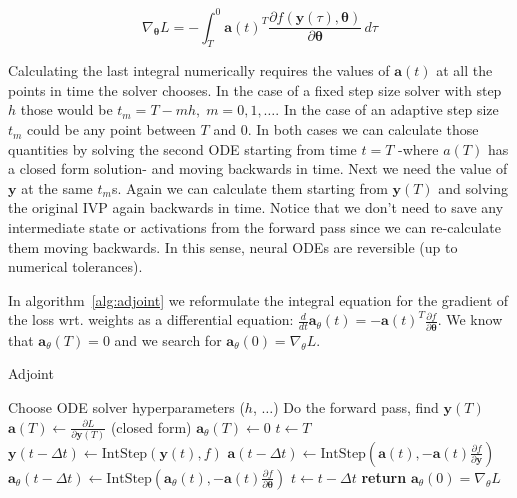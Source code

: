 \documentclass{article}
\begin{document}
    \begin{equation*}
        \nabla_{\pmb{\theta}} L =
        - \int_T^0
        \pmb{a}(t)^T
        \frac
        {\partial f(\pmb{y}(\tau), \pmb{\theta})}
        {\partial \pmb{\theta}}
        \, d\tau
    \end{equation*}

    Calculating the last integral numerically requires the values of $\pmb{a}(t)$ at all the points in time the solver chooses.
    In the case of a fixed step size solver with step $h$ those would be $t_m = T - mh, \; m=0,1,\dots$.
    In the case of an adaptive step size $t_m$ could be any point between $T$ and $0$.
    In both cases we can calculate those quantities by solving the second ODE starting from time $t=T$ -where $a(T)$ has a closed form solution- and moving backwards in time.
    Next we need the value of $\pmb{y}$ at the same $t_m$s. Again we can calculate them starting from $\pmb{y}(T)$ and solving the original IVP again backwards in time.
    Notice that we don't need to save any intermediate state or activations from the forward pass since we can re-calculate them moving backwards.
    In this sense, neural ODEs are reversible (up to numerical tolerances).

    In algorithm~\ref{alg:adjoint} we reformulate the integral equation for the gradient of the loss wrt.
    weights as a differential equation: $ \frac{d}{dt} \pmb{a}_\theta(t) = -\pmb{a}(t)^T \frac{\partial f}{\partial \pmb{\theta}}$.
    We know that $\pmb{a}_\theta(T) = 0$ and we search for $\pmb{a}_\theta(0) = \nabla_\theta L$.

    \begin{algorithm}
        \caption{Adjoint}
        \label{alg:adjoint}
        \begin{algorithmic}
            \State Choose ODE solver hyperparameters ($h$, $\dots$)
            \State Do the forward pass, find $\pmb{y}(T)$
            \State $\pmb{a}(T) \gets \frac{\partial L}{\partial \pmb{y}(T)}$ (closed form)
            \State $\pmb{a}_{\theta}(T) \gets 0$
            \State $t \gets T$
                \State $\pmb{y}(t - \Delta t) \gets \text{IntStep}(\pmb{y}(t), f) $
                \State $\pmb{a}(t - \Delta t) \gets \text{IntStep}(
                \pmb{a}(t), -\pmb{a}(t) \frac{\partial f }{\partial \pmb{y}}
                )$
                \State $\pmb{a}_{\theta}(t - \Delta t) \gets \text{IntStep}(
                \pmb{a}_{\theta}(t), -\pmb{a}(t) \frac{\partial f }{\partial \pmb{\theta}}
                )$
                \State $t \gets t - \Delta t$
            \EndWhile
            \State \textbf{return} $\pmb{a}_\theta(0) = \nabla_\theta L$
        \end{algorithmic}
    \end{algorithm}
\end{document}

